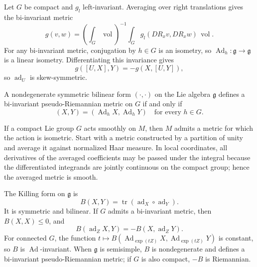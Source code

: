 \begin{remark}
  \label{rem:pet-ch1-ex-24}
  \leanok
  Let $G$ be compact and $g_l$ left-invariant. Averaging over right
  translations gives the bi-invariant metric
  \[
    g(v,w)=\left(\int_G\operatorname{vol}\right)^{-1}
      \int_G g_l(DR_xv,DR_xw)\,\operatorname{vol}.
  \]
  For any bi-invariant metric, conjugation by $h\in G$ is an isometry, so
  $\operatorname{Ad}_h:\mathfrak g\to\mathfrak g$ is a linear isometry.
  Differentiating this invariance gives
  \[
    g([U,X],Y)=-g(X,[U,Y]),
  \]
  so $\operatorname{ad}_U$ is skew-symmetric.
\end{remark}

\begin{remark}
  \label{rem:pet-ch1-ex-25}
  \leanok
  A nondegenerate symmetric bilinear form $(\cdot,\cdot)$ on the Lie algebra
  $\mathfrak g$ defines a bi-invariant pseudo-Riemannian metric on $G$ if and
  only if
  \[
    (X,Y)=(\operatorname{Ad}_hX,\operatorname{Ad}_hY)
    \quad\text{for every }h\in G.
  \]
\end{remark}

\begin{remark}
  \label{rem:pet-ch1-ex-26}
  \leanok
  If a compact Lie group $G$ acts smoothly on $M$, then $M$ admits a metric
  for which the action is isometric. Start with a metric constructed by a
  partition of unity and average it against normalized Haar measure.
  In local coordinates, all derivatives of the averaged coefficients may be
  passed under the integral because the differentiated integrands are jointly
  continuous on the compact group; hence the averaged metric is smooth.
\end{remark}

\begin{remark}
  \label{rem:pet-ch1-ex-27}
  \leanok
  The Killing form on $\mathfrak g$ is
  \[
    B(X,Y)=\operatorname{tr}(\operatorname{ad}_X\circ\operatorname{ad}_Y).
  \]
  It is symmetric and bilinear. If $G$ admits a bi-invariant metric, then
  $B(X,X)\le0$, and
  \[
    B(\operatorname{ad}_ZX,Y)=-B(X,\operatorname{ad}_ZY).
  \]
  For connected $G$, the function
  $t\mapsto B(\operatorname{Ad}_{\exp(tZ)}X,
              \operatorname{Ad}_{\exp(tZ)}Y)$ is constant, so $B$ is
  $\operatorname{Ad}$-invariant. When $\mathfrak g$ is semisimple, $B$ is
  nondegenerate and defines a bi-invariant pseudo-Riemannian metric; if $G$ is
  also compact, $-B$ is Riemannian.
\end{remark}

